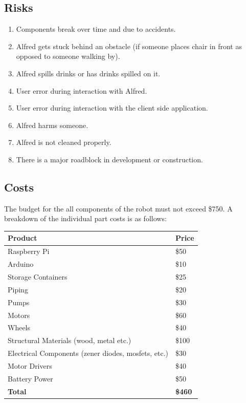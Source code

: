 \documentclass [11pt]{article}
\begin{document}
\subsection{Risks}
	\begin{enumerate}[label=\textbf{(\roman*)}]
		\item Components break over time and due to accidents.
		\item Alfred gets stuck behind an obstacle (if someone places chair in front as opposed to someone walking by).
		\item Alfred spills drinks or has drinks spilled on it.
		\item User error during interaction with Alfred.
		\item User error during interaction with the client side application.
		\item Alfred harms someone.
		\item Alfred is not cleaned properly.
		\item There is a major roadblock in development or construction.
	\end{enumerate}

\pagebreak
\subsection{Costs}	
The budget for the all components of the robot must not exceed \$750. A breakdown of the individual part costs is as follows:

\begin{center}
\begin{tabular}{ | p{8.5cm} | p{1.5cm} | } \hline
 \textbf{Product} & \textbf{Price}  \\ \hline
 Raspberry Pi & \$50  \\ \hline
 Arduino & \$10 \\ \hline
 Storage Containers & \$25 \\ \hline
 Piping & \$20 \\ \hline
 Pumps & \$30 \\ \hline
 Motors & \$60 \\ \hline
 Wheels & \$40 \\ \hline
 Structural Materials (wood, metal etc.) & \$100 \\ \hline
 Electrical Components (zener diodes, mosfets, etc.) & \$30 \\ \hline
 Motor Drivers & \$40 \\ \hline
 Battery Power & \$50 \\ \hline
 \textbf{Total} & \textbf{\$460} \\ \hline
\end{tabular}
\end{center}
\end{document}
